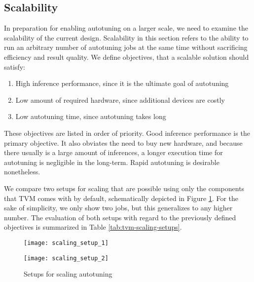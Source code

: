 \subsection{Scalability}\label{sec:scalability}
In preparation for enabling autotuning on a larger scale, we need to examine the scalability of the current design. Scalability in this section refers to the ability to run an arbitrary number of autotuning jobs at the same time without sacrificing efficiency and result quality. We define objectives, that a scalable solution should satisfy:
\begin{enumerate}
	\item High inference performance, since it is the ultimate goal of autotuning
	\item Low amount of required hardware, since additional devices are costly
	\item Low autotuning time, since autotuning takes long
\end{enumerate}
These objectives are listed in order of priority. Good inference performance is the primary objective. It also obviates the need to buy new hardware, and because there usually is a large amount of inferences, a longer execution time for autotuning is negligible in the long-term. Rapid autotuning is desirable nonetheless.

We compare two setups for scaling that are possible using only the components that TVM comes with by default, schematically depicted in Figure \ref{fig:tvm-scaling-setups}. For the sake of simplicity, we only show two jobs, but this generalizes to any higher number. The evaluation of both setups with regard to the previously defined objectives is summarized in Table \ref{tab:tvm-scaling-setups}.

\begin{figure}
	\begin{minipage}[b]{.45\textwidth}
		\centering\texttt{[image: scaling\_setup\_1]}
		\label{fig:tvm-scaling-setups-1}
	\end{minipage}%
	\hspace{2em}
	\begin{minipage}[b]{.45\textwidth}
		\centering\texttt{[image: scaling\_setup\_2]}
		\label{fig:tvm-scaling-setups-2}
	\end{minipage}
	\caption{Setups for scaling autotuning}
	\label{fig:tvm-scaling-setups}
\end{figure}

